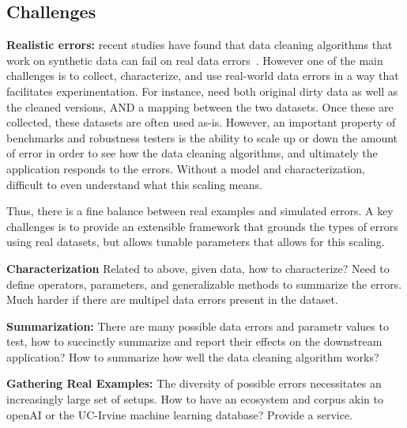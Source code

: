 \subsection{Challenges}

{\bf Realistic errors:} recent studies have found that data cleaning algorithms that work on synthetic data can fail on real data errors~\cite{mikecleaningexp}.  However one of the main challenges is to 
collect, characterize, and use real-world data errors in a way that facilitates experimentation.  For instance, need both original dirty data as well as the cleaned versions, AND a mapping between the two datasets.
Once these are collected, these datasets are often used as-is.  However, an important property of benchmarks and robustness testers is the ability to scale up or down the amount of error in order to see how the data cleaning algorithms, and ultimately the application responds to the errors.  Without a model and characterization, difficult to even understand what this scaling means.

Thus, there is a fine balance between real examples and simulated errors.  A key challenges is to provide an extensible framework that grounds the types of errors using real datasets, but allows tunable parameters that allows for this scaling.

{\bf Characterization}  Related to above, given data, how to characterize?  Need to define operators, parameters, and generalizable methods to summarize the errors.  Much harder if there are multipel data errors present in the dataset.

{\bf Summarization: } There are many possible data errors and parametr values to test, how to succinctly summarize and report their effects on the downstream application?  How to summarize how well the data cleaning algorithm works?

{\bf Gathering Real Examples: }  The diversity of possible errors necessitates an increasingly large set of setups.  How to have an ecosystem and corpus akin to openAI or the UC-Irvine machine learning database?  Provide a service.



